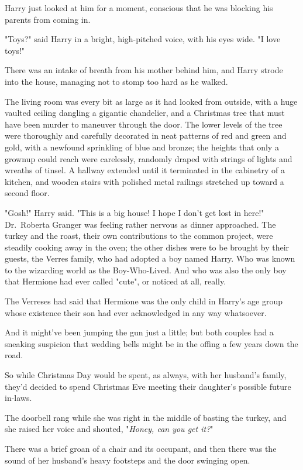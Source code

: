 Harry just looked at him for a moment, conscious that he was blocking his
parents from coming in.

"Toys?" said Harry in a bright, high-pitched voice, with his eyes wide. "I love
toys!"

There was an intake of breath from his mother behind him, and Harry strode into
the house, managing not to stomp too hard as he walked.

The living room was every bit as large as it had looked from outside, with a
huge vaulted ceiling dangling a gigantic chandelier, and a Christmas tree that
must have been murder to maneuver through the door. The lower levels of the
tree were thoroughly and carefully decorated in neat patterns of red and green
and gold, with a newfound sprinkling of blue and bronze; the heights that only
a grownup could reach were carelessly, randomly draped with strings of lights
and wreaths of tinsel. A hallway extended until it terminated in the cabinetry
of a kitchen, and wooden stairs with polished metal railings stretched up
toward a second floor.

"Gosh!" Harry said. "This is a big house! I hope I don't get lost in here!"
\sbreak
Dr.~Roberta Granger was feeling rather nervous as dinner approached. The turkey
and the roast, their own contributions to the common project, were steadily
cooking away in the oven; the other dishes were to be brought by their guests,
the Verres family, who had adopted a boy named Harry. Who was known to the
wizarding world as the Boy-Who-Lived. And who was also the only boy that
Hermione had ever called "cute", or noticed at all, really.

The Verreses had said that Hermione was the only child in Harry's age group
whose existence their son had ever acknowledged in any way whatsoever.

And it might've been jumping the gun just a little; but both couples had a
sneaking suspicion that wedding bells might be in the offing a few years down
the road.

So while Christmas Day would be spent, as always, with her husband's family,
they'd decided to spend Christmas Eve meeting their daughter's possible future
in-laws.

The doorbell rang while she was right in the middle of basting the turkey, and
she raised her voice and shouted, "\emph{Honey, can you get it?}"

There was a brief groan of a chair and its occupant, and then there was the
sound of her husband's heavy footsteps and the door swinging open.

